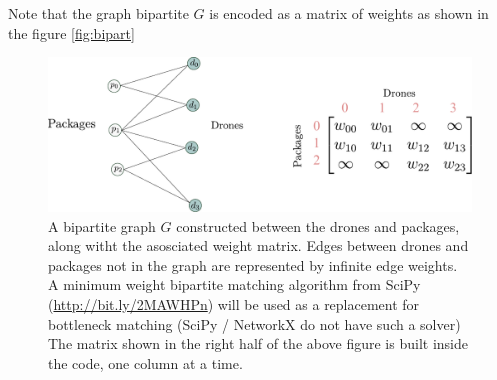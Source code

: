 \documentclass[10pt, english, oneside]{report}
\begin{document}
Note that the graph bipartite $G$ is encoded as a matrix of weights as shown in the 
figure \autoref{fig:bipart}

\begin{figure}[H]
\centering
\includegraphics[width=17cm]{docs/bipartgraph_demo.pdf}
\caption{A bipartite graph $G$ constructed between the drones 
and packages, along witht the asosciated weight matrix. Edges between
drones and packages not in the graph are represented by infinite edge 
weights. A minimum weight bipartite matching algorithm from SciPy (\url{http://bit.ly/2MAWHPn}) will 
be used as a replacement for bottleneck matching (SciPy / NetworkX do not 
have such a solver) The matrix shown in the right half of the above figure is 
built inside the code, one column at a time. }
\end{figure}
\label{fig:bipart}
\end{document}
